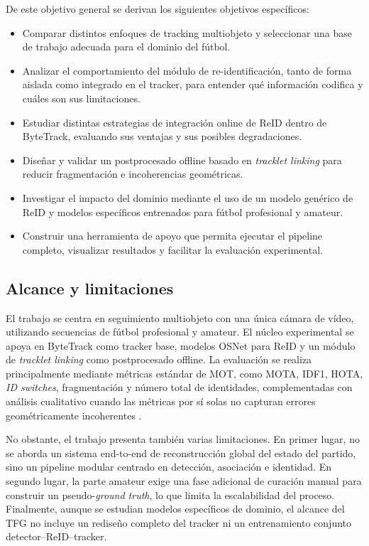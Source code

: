 \documentclass[../MAIN.tex]{subfiles}
\begin{document}
De este objetivo general se derivan los siguientes objetivos específicos:

\begin{itemize}
	\item Comparar distintos enfoques de tracking multiobjeto y seleccionar una base de trabajo adecuada para el dominio del fútbol.
	\item Analizar el comportamiento del módulo de re-identificación, tanto de forma aislada como integrado en el tracker, para entender qué información codifica y cuáles son sus limitaciones.
	\item Estudiar distintas estrategias de integración online de ReID dentro de ByteTrack, evaluando sus ventajas y sus posibles degradaciones.
	\item Diseñar y validar un postprocesado offline basado en \textit{tracklet linking} para reducir fragmentación e incoherencias geométricas.
	\item Investigar el impacto del dominio mediante el uso de un modelo genérico de ReID y modelos específicos entrenados para fútbol profesional y amateur.
	\item Construir una herramienta de apoyo que permita ejecutar el pipeline completo, visualizar resultados y facilitar la evaluación experimental.
\end{itemize}

\subsection{Alcance y limitaciones}

El trabajo se centra en seguimiento multiobjeto con una única cámara de vídeo, utilizando secuencias de fútbol profesional y amateur. El núcleo experimental se apoya en ByteTrack como tracker base, modelos OSNet para ReID y un módulo de \textit{tracklet linking} como postprocesado offline. La evaluación se realiza principalmente mediante métricas estándar de MOT, como MOTA, IDF1, HOTA, \textit{ID switches}, fragmentación y número total de identidades, complementadas con análisis cualitativo cuando las métricas por sí solas no capturan errores geométricamente incoherentes \parencite{cioppa2022soccernettracking, zhang2022bytetrack, cui2023sportsmot}.

No obstante, el trabajo presenta también varias limitaciones. En primer lugar, no se aborda un sistema end-to-end de reconstrucción global del estado del partido, sino un pipeline modular centrado en detección, asociación e identidad. En segundo lugar, la parte amateur exige una fase adicional de curación manual para construir un pseudo-\textit{ground truth}, lo que limita la escalabilidad del proceso. Finalmente, aunque se estudian modelos específicos de dominio, el alcance del TFG no incluye un rediseño completo del tracker ni un entrenamiento conjunto detector--ReID--tracker.
\end{document}
